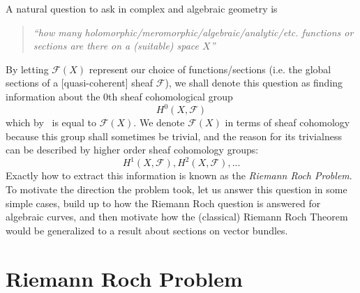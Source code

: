 \documentclass{ut-thesis}
\newcommand{\CF}{{\mathcal{F}}}
\begin{document}
A natural question to ask in complex and algebraic geometry is
\begin{quote}
  \begin{center}
    \emph{``how many holomorphic/meromorphic/algebraic/analytic/etc. functions or sections are there on a (suitable) space
    $X$''}
\end{center}
\end{quote}

By letting $\CF(X)$ represent our choice of functions/sections (i.e. the global sections of a [quasi-coherent]
sheaf $\CF$), we shall denote this question as finding information about the $0$th sheaf cohomological group
\[
  H^0(X, \CF)
\]
which by~\cite{NateAlgGeo} is equal to $\CF(X)$. We denote $\CF(X)$ in terms of sheaf cohomology because this
group shall sometimes be trivial, and the reason for its trivialness can be described by higher order sheaf
cohomology groups:
\[
  H^1(X, \CF), H^2(X, \CF), ...
\]
Exactly how to extract this information is known as the \emph{Riemann Roch Problem}. To motivate the direction
the problem took, let us answer this question in some simple cases, build up to how the Riemann Roch question
is answered for algebraic curves, and then motivate how the (classical) Riemann Roch
Theorem would be generalized to a result about sections on vector bundles.

\section{Riemann Roch Problem}
\end{document}
